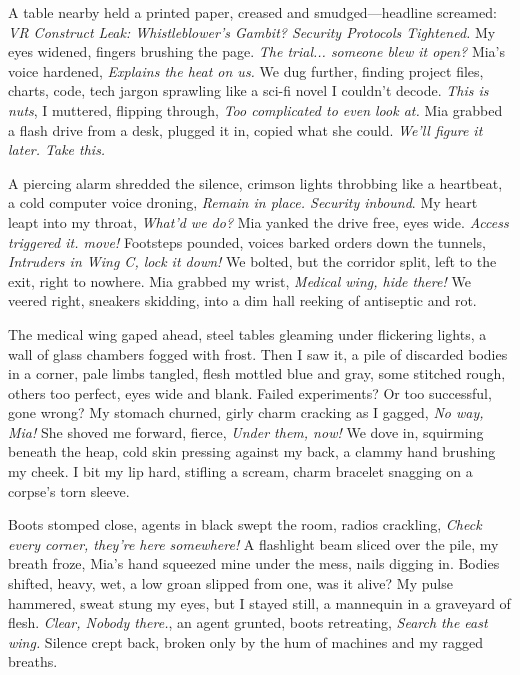 \documentclass[12pt,oneside]{book} %
\begin{document}
A table nearby held a printed paper, creased and smudged—headline screamed: \textit{VR Construct Leak: Whistleblower’s Gambit? Security Protocols Tightened.} My eyes widened, fingers brushing the page. \textit{The trial... someone blew it open?} Mia’s voice hardened, \textit{Explains the heat on us.} We dug further, finding project files, charts, code, tech jargon sprawling like a sci-fi novel I couldn’t decode. \textit{This is nuts}, I muttered, flipping through, \textit{Too complicated to even look at.} Mia grabbed a flash drive from a desk, plugged it in, copied what she could. \textit{We’ll figure it later. Take this.}

A piercing alarm shredded the silence, crimson lights throbbing like a heartbeat, a cold computer voice droning, \textit{Remain in place. Security inbound}. My heart leapt into my throat, \textit{What’d we do?} Mia yanked the drive free, eyes wide. \textit{Access triggered it. move!} Footsteps pounded, voices barked orders down the tunnels, \textit{Intruders in Wing C, lock it down!} We bolted, but the corridor split, left to the exit, right to nowhere. Mia grabbed my wrist, \textit{Medical wing, hide there!} We veered right, sneakers skidding, into a dim hall reeking of antiseptic and rot.

The medical wing gaped ahead, steel tables gleaming under flickering lights, a wall of glass chambers fogged with frost. Then I saw it, a pile of discarded bodies in a corner, pale limbs tangled, flesh mottled blue and gray, some stitched rough, others too perfect, eyes wide and blank. Failed experiments? Or too successful, gone wrong? My stomach churned, girly charm cracking as I gagged, \textit{No way, Mia!} She shoved me forward, fierce, \textit{Under them, now!} We dove in, squirming beneath the heap, cold skin pressing against my back, a clammy hand brushing my cheek. I bit my lip hard, stifling a scream, charm bracelet snagging on a corpse’s torn sleeve.

Boots stomped close, agents in black swept the room, radios crackling, \textit{Check every corner, they’re here somewhere!} A flashlight beam sliced over the pile, my breath froze, Mia’s hand squeezed mine under the mess, nails digging in. Bodies shifted, heavy, wet, a low groan slipped from one, was it alive? My pulse hammered, sweat stung my eyes, but I stayed still, a mannequin in a graveyard of flesh. \textit{Clear, Nobody there.}, an agent grunted, boots retreating, \textit{Search the east wing.} Silence crept back, broken only by the hum of machines and my ragged breaths.
\end{document}
